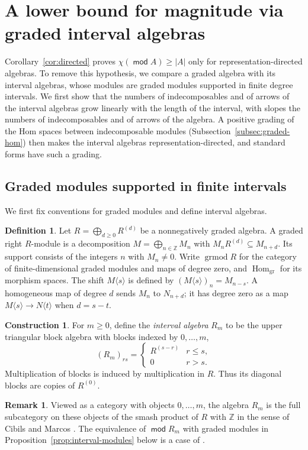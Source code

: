 \documentclass[a4paper,reqno,10pt]{amsart}
\theoremstyle{definition}
\newtheorem{definition}[theorem]{Definition}
\newtheorem{construction}[theorem]{Construction}
\newtheorem{remark}[theorem]{Remark}
\numberwithin{equation}{section}
\DeclareMathOperator{\moduleCategory}{\mathsf{mod}}
\renewcommand{\mod}{\moduleCategory}
\DeclareMathOperator{\Hom}{Hom}
\begin{document}
\section{A lower bound for magnitude via graded interval algebras}\label{sec:general}
Corollary~\ref{cor:directed} proves \(\chi(\mod A)\geq|A|\) only for
representation-directed algebras. To remove this hypothesis, we compare a
graded algebra with its interval algebras, whose modules are graded modules
supported in finite degree intervals. We first show that the numbers of
indecomposables and of arrows of the interval algebras grow linearly with
the length of the interval, with slopes the numbers of indecomposables and
of arrows of the algebra. A positive grading of
the Hom spaces between indecomposable modules (Subsection~\ref{subsec:graded-hom})
then makes the interval algebras representation-directed, and standard forms have such a grading.

\subsection{Graded modules supported in finite intervals}
We first fix conventions for graded modules and define interval algebras.
\begin{definition}\label{def:graded-modules}
Let \(R=\bigoplus_{d\geq0}R^{(d)}\) be a nonnegatively graded algebra.
A graded right \(R\)-module is a decomposition
\(M=\bigoplus_{n\in\mathbb Z}M_n\) with
\(M_nR^{(d)}\subseteq M_{n+d}\). Its support consists of the integers
\(n\) with \(M_n\ne0\). Write \(\operatorname{grmod}R\) for the category
of finite-dimensional graded modules and maps of degree zero, and
\(\Hom_{\mathrm{gr}}\) for its morphism spaces.
The shift \(M\langle s\rangle\) is defined by
\((M\langle s\rangle)_n=M_{n-s}\). A homogeneous map of degree \(d\)
sends \(M_n\) to \(N_{n+d}\); it has degree zero as a map
\(M\langle s\rangle\to N\langle t\rangle\) when \(d=s-t\).
\end{definition}

\begin{construction}\label{con:interval}
For \(m\geq0\), define the \emph{interval algebra} \(R_m\) to be the
upper triangular block algebra with blocks indexed by \(0,\ldots,m\),
\begin{equation}\label{eq:interval-algebra}
 (R_m)_{rs}=\begin{cases}R^{(s-r)}&r\leq s,\\0&r>s.\end{cases}
\end{equation}
Multiplication of blocks is induced by multiplication in \(R\).
Thus its diagonal blocks are copies of \(R^{(0)}\).
\end{construction}
\begin{remark}
Viewed as a category with objects \(0,\ldots,m\), the algebra \(R_m\) is
the full subcategory on these objects of the smash product of \(R\) with
\(\mathbb Z\) in the sense of Cibils and Marcos
\cite[Definition~3.1]{CM}. The equivalence of \(\mod R_m\) with graded
modules in Proposition~\ref{prop:interval-modules} below is a case of
\cite[Theorem~6.6]{GG1}.
\end{remark}
\end{document}
